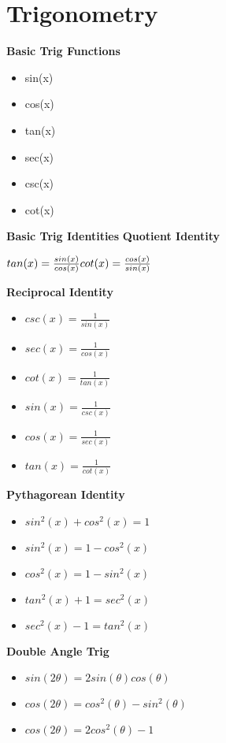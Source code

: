 \documentclass{article}
\begin{document}
\section{Trigonometry}
\textbf{Basic Trig Functions}
\begin{itemize}
    \item sin(x)
    \item cos(x)
    \item tan(x)
    \item sec(x)
    \item csc(x)
    \item cot(x)
\end{itemize}
\textbf{Basic Trig Identities}\newline
\textbf{Quotient Identity}\newline 

    $
    tan(x) = \frac{sin(x)}{cos(x)} \newline
    cot(x) = \frac{cos(x)}{sin(x)} \newline 
    $

\textbf{Reciprocal Identity}\newline
\begin{itemize}
    \item $ csc(x) = \frac{1}{sin(x)}$
    \item $sec(x) = \frac{1}{cos(x)}$
    \item $cot(x) = \frac{1}{tan(x)}$
    \item $sin(x) = \frac{1}{csc(x)}$
    \item $cos(x) = \frac{1}{sec(x)}$
    \item $tan(x) = \frac{1}{cot(x)}$
    
\end{itemize}

\textbf{Pythagorean Identity}\newline 
\begin{itemize}
    \item $ sin^{2}(x)+cos^{2}(x) =1$
    \item $ sin^{2}(x) = 1-cos^{2}(x) $
    \item $ cos^{2}(x) = 1 - sin^{2}(x)$
    \item $tan^{2}(x) + 1 =  sec^{2}(x)$
    \item $sec^{2}(x)-1 = tan^{2}(x)$
\end{itemize}
\textbf{Double Angle Trig}
\begin{itemize}
    \item $ sin(2\theta) = 2sin(\theta)cos(\theta)$
    \item $ cos(2\theta) = cos^{2}(\theta)-sin^{2}(\theta)$
    \item $cos(2\theta) = 2cos^{2}(\theta) -1 $
\end{itemize}
\end{document}
